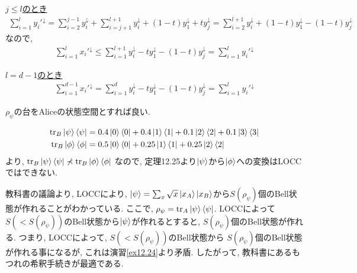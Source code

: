 \begin{ex}
    \par
    \underline{$j \le l $のとき}\
    \begin{align*}
        \sum_{i=1}^l y_i'^\downarrow = \sum_{i=2}^{j-1} y_i^\downarrow + \sum_{i=j+1}^{l+1} y_i^\downarrow + (1-t) y_1^\downarrow + t y_j^\downarrow
        =
        \sum_{i=2}^{l+1} y_i^\downarrow + (1-t) y_1^\downarrow - (1- t)  y_j^\downarrow
    \end{align*}
    なので,
    \begin{align*}
        \sum_{i=1}^l x_i'^\downarrow
        \le
        \sum_{i=1}^{l+1} y_i^\downarrow - t y_1^\downarrow - (1-t)y_j^\downarrow
        =
        \sum_{i=1}^l y_i'^\downarrow
    \end{align*}
    \par
    \underline{$l = d - 1 $のとき}\
    \begin{align*}
        \sum_{i=1}^{d-1} x_i'^\downarrow
        =
        \sum_{i=1}^{d} y_i^\downarrow - t y_1^\downarrow - (1-t)y_j^\downarrow
        =
        \sum_{i=1}^l y_i'^\downarrow
    \end{align*}
\end{ex}

\begin{ex}
    \label{ex12.20}
    $\rho_\psi$の台をAliceの状態空間とすれば良い.
\end{ex}

\begin{ex}
    \label{ex12.21}
    \begin{align*}
        \mathrm{tr}_B \ket{\psi}\bra{\psi}
         & = 0.4 \ket{0}\bra{0} + 0.4 \ket{1}\bra{1} + 0.1 \ket{2}\bra{2} + 0.1 \ket{3}\bra{3}
        \\
        \mathrm{tr}_B \ket{\phi}\bra{\phi}
         & = 0.5 \ket{0}\bra{0} + 0.25 \ket{1}\bra{1} + 0.25 \ket{2}\bra{2}
    \end{align*}
    より, $\mathrm{tr}_B \ket{\psi}\bra{\psi} \nprec \mathrm{tr}_B \ket{\phi}\bra{\phi}$
    なので, 定理12.25より$\ket{\psi}$から$\ket{\phi}$への変換はLOCCではできない.
\end{ex}

\begin{ex}
    \label{ex12.22}

\end{ex}

\begin{ex}
    \label{ex12.23}
    教科書の議論より, LOCCにより, $\ket{\psi} = \sum_x \sqrt{x} \ket{x_A}\ket{x_B}$から$S(\rho_\psi)$個のBell状態が作れることがわかっている. ここで, $\rho_\psi = \mathrm{tr}_A \ket{\psi}\bra{\psi}$.
    LOCCによって$S (< S(\rho_\psi))$のBell状態から$\ket{\psi}$が作れるとすると, $S(\rho_\psi)$個のBell状態が作れる. つまり, LOCCによって, $S (< S(\rho_\psi))$のBell状態から $S(\rho_\psi)$個のBell状態が作れる事になるが, これは演習\ref{ex12.24}より矛盾. したがって, 教科書にあるもつれの希釈手続きが最適である.
\end{ex}

